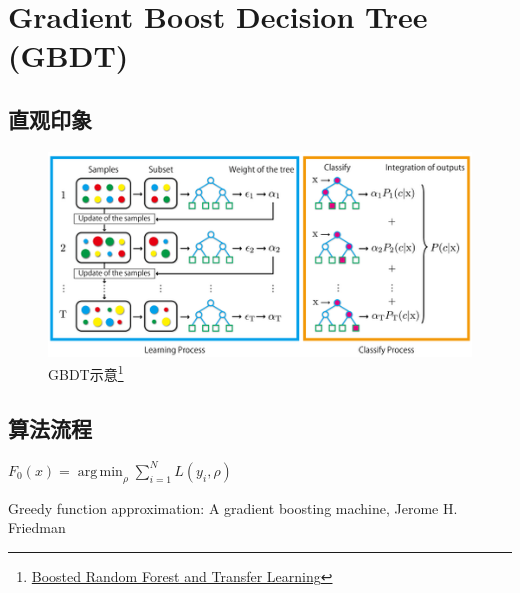 
\section{Gradient Boost Decision Tree (GBDT)}
\subsection{直观印象}
\begin{frame}
    \begin{figure}[!tb]
        \includegraphics[width=1.2\onepicwidth]{figure/gbdt/OurMethodv81}
        \caption{GBDT示意\footnote{
                 \href{http://mprg.jp/research/boostedrandomforest_e}{Boosted Random Forest and Transfer Learning}}}
    \end{figure}
\end{frame}


\subsection{算法流程}
\begin{frame}
    \begin{algorithm}[H]
        $F_0(x) = \operatorname{arg \, min}_\rho \sum_{i=1}^N L(y_i, \rho)$ \;
        \caption{Gradient\_Boost}
    \end{algorithm}
    {\tiny Greedy function approximation: A gradient boosting machine, Jerome H. Friedman}
\end{frame}


